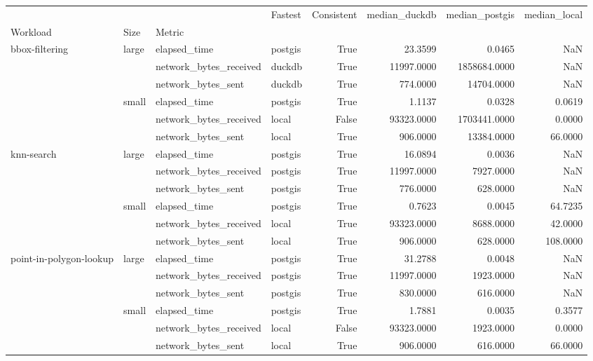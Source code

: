 \begin{tabular}{llllrrrr}
\toprule
 &  &  & Fastest & Consistent & median\_duckdb & median\_postgis & median\_local \\
Workload & Size & Metric &  &  &  &  &  \\
\midrule
\multirow[t]{6}{*}{bbox-filtering} & \multirow[t]{3}{*}{large} & elapsed\_time & postgis & True & 23.3599 & 0.0465 & NaN \\
 &  & network\_bytes\_received & duckdb & True & 11997.0000 & 1858684.0000 & NaN \\
 &  & network\_bytes\_sent & duckdb & True & 774.0000 & 14704.0000 & NaN \\
\cline{2-8}
 & \multirow[t]{3}{*}{small} & elapsed\_time & postgis & True & 1.1137 & 0.0328 & 0.0619 \\
 &  & network\_bytes\_received & local & False & 93323.0000 & 1703441.0000 & 0.0000 \\
 &  & network\_bytes\_sent & local & True & 906.0000 & 13384.0000 & 66.0000 \\
\cline{1-8} \cline{2-8}
\multirow[t]{6}{*}{knn-search} & \multirow[t]{3}{*}{large} & elapsed\_time & postgis & True & 16.0894 & 0.0036 & NaN \\
 &  & network\_bytes\_received & postgis & True & 11997.0000 & 7927.0000 & NaN \\
 &  & network\_bytes\_sent & postgis & True & 776.0000 & 628.0000 & NaN \\
\cline{2-8}
 & \multirow[t]{3}{*}{small} & elapsed\_time & postgis & True & 0.7623 & 0.0045 & 64.7235 \\
 &  & network\_bytes\_received & local & True & 93323.0000 & 8688.0000 & 42.0000 \\
 &  & network\_bytes\_sent & local & True & 906.0000 & 628.0000 & 108.0000 \\
\cline{1-8} \cline{2-8}
\multirow[t]{6}{*}{point-in-polygon-lookup} & \multirow[t]{3}{*}{large} & elapsed\_time & postgis & True & 31.2788 & 0.0048 & NaN \\
 &  & network\_bytes\_received & postgis & True & 11997.0000 & 1923.0000 & NaN \\
 &  & network\_bytes\_sent & postgis & True & 830.0000 & 616.0000 & NaN \\
\cline{2-8}
 & \multirow[t]{3}{*}{small} & elapsed\_time & postgis & True & 1.7881 & 0.0035 & 0.3577 \\
 &  & network\_bytes\_received & local & False & 93323.0000 & 1923.0000 & 0.0000 \\
 &  & network\_bytes\_sent & local & True & 906.0000 & 616.0000 & 66.0000 \\
\cline{1-8} \cline{2-8}
\bottomrule
\end{tabular}
